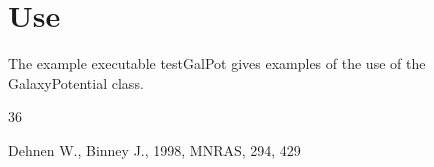 \documentclass{article}
\begin{document}
\section{Use}
The example executable testGalPot gives examples of the use of the GalaxyPotential class.


\begin{thebibliography}{36}


{Dehnen} W., {Binney} J., 1998, MNRAS, 294, 429

\end{thebibliography}
\end{document}
